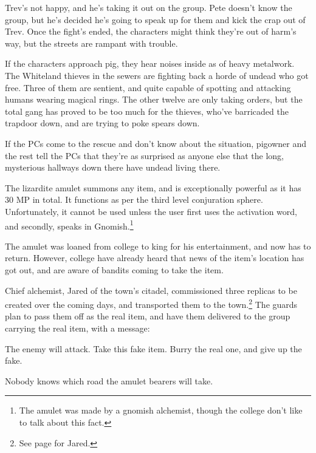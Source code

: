 \begin{multicols}{2}
Trev's not happy, and he's taking it out on the group.  Pete doesn't know the group, but he's decided he's going to speak up for them and kick the crap out of Trev.  Once the fight's ended, the characters might think they're out of harm's way, but the streets are rampant with trouble.


\humanfarmer

If the characters approach \gls{pig}, they hear noises inside as of heavy metalwork.  The Whiteland thieves in the sewers are fighting back a horde of undead who got free.  Three of them are sentient, and quite capable of spotting and attacking humans wearing magical rings.  The other twelve are only taking orders, but the total gang has proved to be too much for the thieves, who've barricaded the trapdoor down, and are trying to poke spears down.

If the PCs come to the rescue and don't know about the situation, \gls{pigowner} and the rest tell the PCs that they're as surprised as anyone else that the long, mysterious hallways down there have undead living there.


The lizardite amulet summons any item, and is exceptionally powerful as it has 30 MP in total.  It functions as per the third level conjuration sphere.  Unfortunately, it cannot be used unless the user first uses the activation word, and secondly, speaks in Gnomish.\footnote{The amulet was made by a gnomish alchemist, though the college don't like to talk about this fact.}

The amulet was loaned from \gls{college} to \gls{king} for his entertainment, and now has to return.  However, \gls{college} have already heard that news of the item's location has got out, and are aware of bandits coming to take the item.

Chief alchemist, Jared of the town's citadel, commissioned three replicas to be created over the coming days, and transported them to the town.\footnote{See page \pageref{citadel_alchemist} for Jared.}
The guards plan to pass them off as the real item, and have them delivered to the group carrying the real item, with a message:

\begin{boxtext}
	The enemy will attack. Take this fake item.  Burry the real one, and give up the fake.
\end{boxtext}

Nobody knows which road the amulet bearers will take.


\end{multicols}
